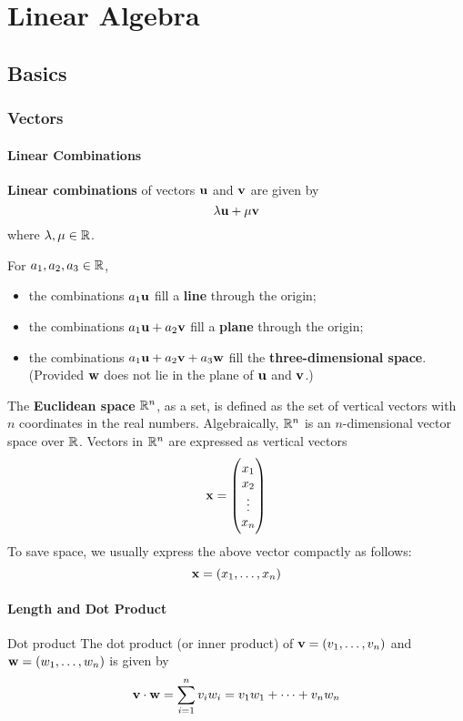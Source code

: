 \part{Linear Algebra}
\chapter{Basics}
\section{Vectors}
\subsection{Linear Combinations}
\textbf{Linear combinations} of vectors $\vb{u}$ and $\vb{v}$ are given by
\[ \lambda\vb{u}+\mu\vb{v} \]
where $\lambda,\mu\in\mathbb R$.

For $a_1,a_2,a_3\in\mathbb R$, 
\begin{itemize}
\item the combinations $a_1\vb{u}$ fill a \textbf{line} through the origin; 
\item the combinations $a_1\vb{u}+a_2\vb{v}$ fill a \textbf{plane} through the origin; 
\item the combinations $a_1\vb{u}+a_2\vb{v}+a_3\vb{w}$ fill the \textbf{three-dimensional space}. (Provided $\vb{w}$ does not lie in the plane of $\vb{u}$ and $\vb{v}$.)
\end{itemize}

The \textbf{Euclidean space} $\mathbb R^n$, as a set, is defined as the set of vertical vectors with $n$ coordinates in the real numbers. Algebraically, $\mathbb R^n$ is an $n$-dimensional vector space over $\mathbb R$. Vectors in $\mathbb R^n$ are expressed as vertical vectors 
\[ \vb{x} = \begin{pmatrix} x_1 \\ x_2 \\ \vdots \\ x_n \end{pmatrix} \]
To save space, we usually express the above vector compactly as follows:
\[ \vb{x}=(x_1,\dots,x_n) \]

\subsection{Length and Dot Product}
\begin{defn}{Dot product}{}
The dot product (or inner product) of $\vb{v}=(v_1,\dots,v_n)$ and $\vb{w}=(w_1,\dots,w_n)$ is given by
\begin{equation}
\vb{v} \cdot \vb{w} = \sum_{i=1}^nv_iw_i = v_1w_1 + \cdots + v_nw_n
\end{equation}
\end{defn}

